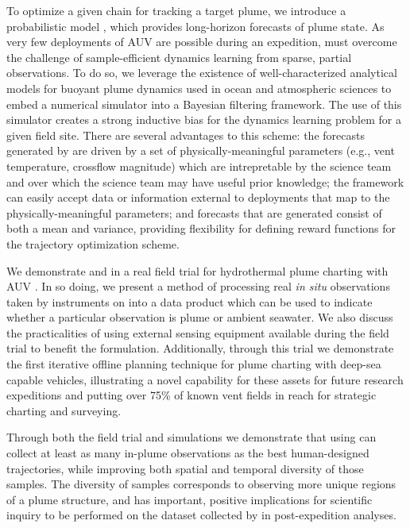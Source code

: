 To optimize a given chain for tracking a target plume, we introduce a probabilistic model \PHUMES, which provides long-horizon forecasts of plume state. As very few deployments of AUV \Sentry are possible during an expedition, \PHUMES must overcome the challenge of sample-efficient dynamics learning from sparse, partial observations. To do so, we leverage the existence of well-characterized analytical models for buoyant plume dynamics used in ocean and atmospheric sciences to embed a numerical simulator into a Bayesian filtering framework. The use of this simulator creates a strong inductive bias for the dynamics learning problem for a given field site. There are several advantages to this scheme: the forecasts generated by \PHUMES are driven by a set of physically-meaningful parameters (e.g., vent temperature, crossflow magnitude) which are intrepretable by the science team and over which the science team may have useful prior knowledge; the \PHUMES framework can easily accept data or information external to \Sentry deployments that map to the physically-meaningful parameters; and forecasts that are generated consist of both a mean and variance, providing flexibility for defining reward functions for the trajectory optimization scheme.

We demonstrate \PHORTEX and \PHUMES in a real field trial for hydrothermal plume charting with AUV \Sentry. In so doing, we present a method of processing real \emph{in situ} observations taken by instruments on \Sentry into a data product which can be used to indicate whether a particular observation is plume or ambient seawater. We also discuss the practicalities of using external sensing equipment available during the field trial to benefit the \PHUMES formulation. Additionally, through this trial we demonstrate the first iterative offline planning technique for plume charting with deep-sea capable vehicles, illustrating a novel capability for these assets for future research expeditions and putting over 75\% of known vent fields in reach for strategic charting and surveying.

Through both the field trial and simulations we demonstrate that \Sentry using \PHORTEX can collect at least as many in-plume observations as the best human-designed trajectories, while improving both spatial and temporal diversity of those samples. The diversity of samples corresponds to observing more unique regions of a plume structure, and has important, positive implications for scientific inquiry to be performed on the dataset collected by \Sentry in post-expedition analyses. 

